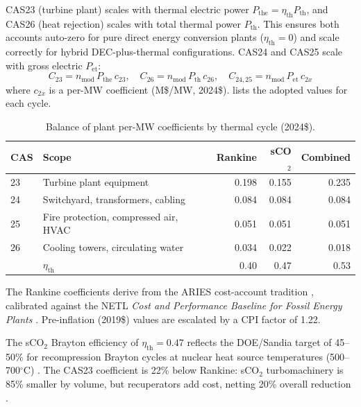 \documentclass{article}
\begin{document}
CAS23 (turbine plant) scales with thermal electric power
$P_{\text{the}} = \eta_{\text{th}} P_{\text{th}}$, and CAS26 (heat
rejection) scales with total thermal power $P_{\text{th}}$.  This ensures
both accounts auto-zero for pure direct energy conversion plants
($\eta_{\text{th}} = 0$) and scale correctly for hybrid DEC-plus-thermal
configurations.  CAS24 and CAS25 scale with gross electric $P_{\text{et}}$:
\begin{equation}
\label{eq:bop}
C_{23} = n_{\text{mod}} \, P_{\text{the}} \, c_{23}, \quad
C_{26} = n_{\text{mod}} \, P_{\text{th}} \, c_{26}, \quad
C_{24,25} = n_{\text{mod}} \, P_{\text{et}} \, c_{2x}
\end{equation}
\noindent where $c_{2x}$ is a per-MW coefficient (M\$/MW, 2024\$).
 lists the adopted values for each cycle.

\begin{table}[htbp]
\caption{Balance of plant per-MW coefficients by thermal cycle (2024\$).}
\label{tab:bop}
\centering
\begin{tabular}{llrrr}
\toprule
CAS & Scope & Rankine & sCO$_2$ & Combined \\
\midrule
23 & Turbine plant equipment & 0.198 & 0.155 & 0.235 \\
24 & Switchyard, transformers, cabling & 0.084 & 0.084 & 0.084 \\
25 & Fire protection, compressed air, HVAC & 0.051 & 0.051 & 0.051 \\
26 & Cooling towers, circulating water & 0.034 & 0.022 & 0.018 \\
\midrule
& $\eta_{\text{th}}$ & 0.40 & 0.47 & 0.53 \\
\bottomrule
\end{tabular}
\end{table}

The Rankine coefficients derive from the ARIES cost-account tradition
\citep{waganer2013}, calibrated against the NETL \textit{Cost and
Performance Baseline for Fossil Energy Plants} \citep{netl2022}.  Pre-inflation
(2019\$) values are escalated by a CPI factor of 1.22.

The sCO$_2$ Brayton efficiency of $\eta_{\text{th}} = 0.47$ reflects the
DOE/Sandia target of 45--50\% for recompression Brayton cycles at nuclear
heat source temperatures (500--700$^\circ$C)
\citep{doe_qtr2015_sco2,sandia_aec}.  The CAS23 coefficient is 22\% below
Rankine: sCO$_2$ turbomachinery is 85\% smaller by volume, but
recuperators add cost, netting 20\% overall reduction
\citep{ncepu_sco2_comparison}.
\end{document}
